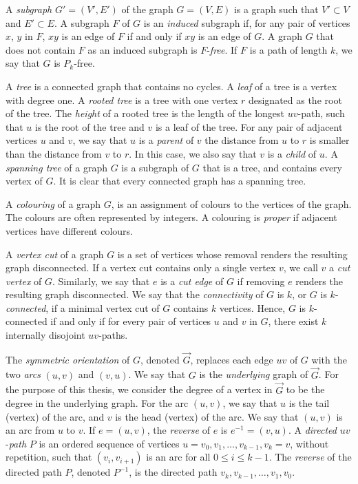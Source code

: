 \documentclass[12pt,letterpaper,oneside]{book}
\begin{document}
A \emph{subgraph} $G'=(V',E')$ of the graph $G=(V,E)$ is a graph such that $V'\subset V$ and $E'\subset E$.   
A subgraph $F$ of $G$ is an \emph{induced} subgraph if, for any pair of vertices $x$, $y$ in $F$, 
$xy$ is an edge of $F$ if and only if $xy$ is an edge of $G$.  A graph $G$ that does not contain 
$F$ as an induced subgraph is $F$-\emph{free}.  If $F$ is a path of length $k$, we say that 
$G$ is $P_k$-free.  

A \emph{tree} is a connected graph that contains no cycles.  A \emph{leaf} of a tree is a 
vertex with degree one.  A \emph{rooted tree} is a tree with one vertex $r$ designated as the root of the tree.  The 
\emph{height} of a rooted tree is the length of the longest $uv$-path, such that $u$ is the root of the tree and $v$ is a leaf of the tree.  
For any pair of adjacent vertices $u$ and $v$, we say that $u$ is a \emph{parent} of $v$ the distance from $u$ to $r$ is 
smaller than the distance from $v$ to $r$.  In this case, we also say that $v$ is a \emph{child} of $u$.  
A \emph{spanning tree} of a graph $G$ is a subgraph of $G$ that is a tree, and contains every vertex of $G$.  It is clear 
that every connected graph has a spanning tree.  


A \emph{colouring} of a graph $G$, is an assignment of colours to the vertices of the graph.  The colours 
are often represented by integers.  
A colouring is \emph{proper} if adjacent vertices have different colours.  %


A \emph{vertex cut} of a graph $G$ is a set of vertices whose removal renders the resulting graph disconnected.  If 
a vertex cut contains only a single vertex $v$, we call $v$ a \emph{cut vertex} of $G$.  Similarly, we 
say that $e$ is a \emph{cut edge} of $G$ if removing $e$ renders the resulting graph disconnected.  We say that 
the \emph{connectivity} of $G$ is $k$, or $G$ is $k$-\emph{connected}, if a minimal vertex cut 
of $G$ contains $k$ vertices.  Hence, $G$ is $k$-connected if and only if for every pair of vertices $u$ and 
$v$ in $G$, there exist 
$k$ internally disojoint $uv$-paths.  

The \emph{symmetric orientation} of $G$, denoted $\vec{G}$, replaces each edge $uv$ of $G$ with the two 
\emph{arcs} $(u,v)$ and $(v,u)$.  
We say that $G$ is the \emph{underlying} graph of $\vec{G}$.  For the purpose of this thesis, we consider the 
degree of a vertex in $\vec{G}$ 
to be the degree in the underlying graph. 
For the arc $(u,v)$, we say that $u$ is the tail (vertex) of the arc, 
and $v$ is the head (vertex) of the arc.  We say that $(u,v)$ is an arc from $u$ to $v$.  
If $e=(u,v)$, the 
\emph{reverse} of $e$ is $e^{-1}=(v,u)$.  
A \emph{directed} $uv$-\emph{path} $P$ is an ordered sequence of vertices 
$u=v_0, v_1, \ldots, v_{k-1}, v_k=v$, without repetition, such that $(v_i,v_{i+1})$ is an arc for 
all $0 \le i \le k-1$.  The \emph{reverse} of the directed path $P$, denoted $P^{-1}$, is the 
directed path $v_k, v_{k-1}, \ldots, v_1,v_0$.  
\end{document}
